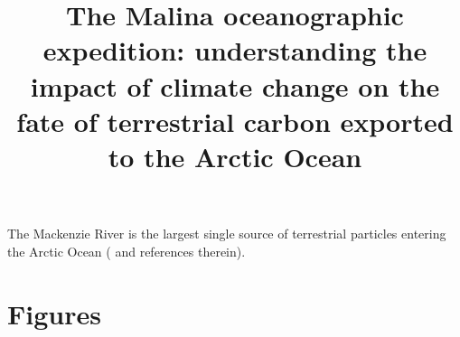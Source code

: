 \documentclass[essd, manuscript]{copernicus}
\begin{document}
\title{The Malina oceanographic expedition: understanding the impact of climate change on the fate of terrestrial carbon exported to the Arctic Ocean}


    





\received{}
\pubdiscuss{} %
\revised{}
\accepted{}
\published{}



\maketitle

\begin{abstract}
\end{abstract}


\introduction  %

The Mackenzie River is the largest single source of terrestrial particles entering the Arctic Ocean (\citealp{Doxaran2015} and references therein).

\section{Figures}
\end{document}
